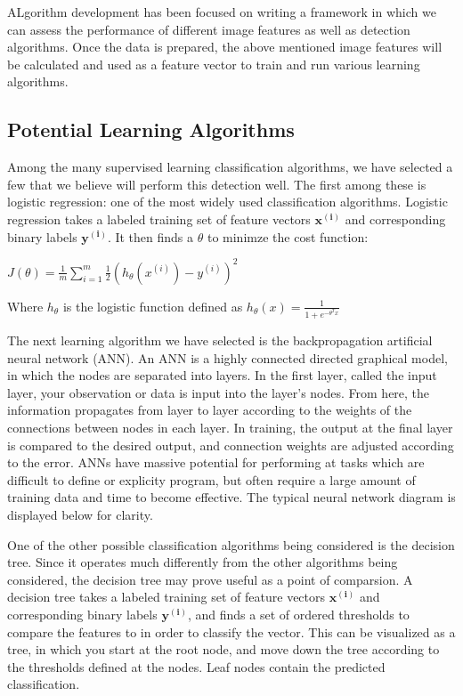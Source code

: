 ALgorithm development has been focused on writing a framework in which we can assess the performance of different image features as well as detection algorithms.
Once the data is prepared, the above mentioned image features will be calculated and used as a feature vector to train and run various learning algorithms.

\subsection {Potential Learning Algorithms}
Among the many supervised learning classification algorithms, we have selected a few that we believe will perform this detection well.
The first among these is logistic regression: one of the most widely used classification algorithms.
Logistic regression takes a labeled training set of feature vectors $\mathbf{x^{(i)}}$ and corresponding binary labels $\mathbf{y^{(i)}}$.
It then finds a $\theta$ to minimze the cost function:

\begin{center}
\begin{math}
J(\theta) = \frac{1}{m} \sum\limits_{i=1}^m\frac{1}{2}(h_\theta(x^{(i)})-y^{(i)})^2
\end{math}
\end{center}

\noindent Where $h_\theta$ is the logistic function defined as $h_\theta(x) = \frac{1}{1+e^{-\theta^Tx}}$

The next learning algorithm we have selected is the backpropagation artificial neural network (ANN).
An ANN is a highly connected directed graphical model, in which the nodes are separated into layers.
In the first layer, called the input layer, your observation or data is input into the layer's nodes.
From here, the information propagates from layer to layer according to the weights of the connections between nodes in each layer.
In training, the output at the final layer is compared to the desired output, and connection weights are adjusted according to the error.
ANNs have massive potential for performing at tasks which are difficult to define or explicity program, but often require a large amount of training data and time to become effective.
The typical neural network diagram is displayed below for clarity.

One of the other possible classification algorithms being considered is the decision tree. 
Since it operates much differently from the other algorithms being considered, the decision tree may prove useful as a point of comparsion.
A decision tree takes a labeled training set of feature vectors $\mathbf{x^{(i)}}$ and corresponding binary labels $\mathbf{y^{(i)}}$, and finds a set of ordered thresholds to compare the features to in order to classify the vector.
This can be visualized as a tree, in which you start at the root node, and move down the tree according to the thresholds defined at the nodes.
Leaf nodes contain the predicted classification.

